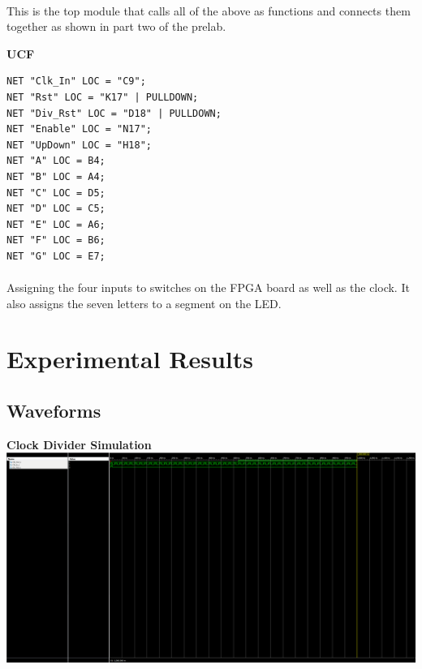 \documentclass[12pt]{report}
\begin{document}
		\paragraph*{}
			This is the top module that calls all of the above as functions and connects them 
			together as shown in part two of the prelab.
		\vspace{1cm}

	\textbf{UCF}
		\begin{Verbatim}[frame=single, fontsize=\small]
NET "Clk_In" LOC = "C9";
NET "Rst" LOC = "K17" | PULLDOWN;
NET "Div_Rst" LOC = "D18" | PULLDOWN;
NET "Enable" LOC = "N17";
NET "UpDown" LOC = "H18";
NET "A" LOC = B4;
NET "B" LOC = A4;
NET "C" LOC = D5;
NET "D" LOC = C5;
NET "E" LOC = A6;
NET "F" LOC = B6;
NET "G" LOC = E7;
		\end{Verbatim}
		\paragraph*{}
			Assigning the four inputs to switches on the FPGA board as well as the clock.  It 
			also assigns the seven letters to a segment on the LED.

\section*{Experimental Results}
	
	\subsection*{Waveforms}
		\vspace{1cm}
		\begin{center}
			\textbf{Clock Divider Simulation}
			\includegraphics[scale=.28]{tb_1.PNG}
		\end{center}
\end{document}
